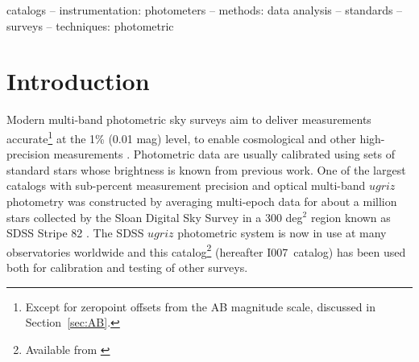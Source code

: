 \documentclass[fleqn,usenatbib]{mnras}
\newcommand{\pO}{\hbox{I007}}
\newcommand{\pOc}{\hbox{I007 catalog}}
\begin{document}
\begin{keywords}
catalogs -- instrumentation: photometers -- methods: data analysis -- standards -- surveys --
techniques: photometric
\end{keywords}



\section{Introduction} \label{sec:intro}

Modern multi-band photometric sky surveys aim to deliver measurements accurate\footnote{Except for zeropoint offsets from the AB magnitude scale, discussed in Section~\ref{sec:AB}.} at the 1\% (0.01 mag) level, to enable cosmological and other high-precision measurements \citealt[e.g., the Vera Rubin Observatory Legacy Survey of Space and Time,][]{LSSToverview}. Photometric data are usually calibrated using sets of standard stars whose brightness is known from previous work. One of the largest catalogs with sub-percent measurement precision and optical multi-band $ugriz$ photometry
was constructed by averaging multi-epoch data for about a million stars collected by the Sloan Digital Sky Survey \citep[SDSS,][]{York2000}  in a 300 deg$^2$ region known as SDSS Stripe 82 \citep[][hereafter \pO]{Ivez07}. The SDSS $ugriz$ photometric system is now in use at many observatories worldwide and this catalog\footnote{Available from \url{}} (hereafter \pOc) has been used both for calibration and testing of other surveys. 
\end{document}
